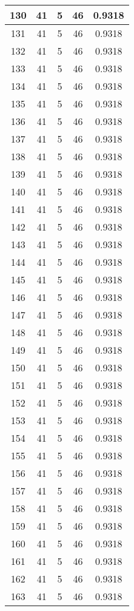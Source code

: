 \documentclass[letterpaper, 12pt]{article}
\begin{document}
\begin{longtable}{|c|c|c|c|c|}
\hline
130 & 41 & 5 & 46 & 0.9318 \\
\hline
131 & 41 & 5 & 46 & 0.9318 \\
\hline
132 & 41 & 5 & 46 & 0.9318 \\
\hline
133 & 41 & 5 & 46 & 0.9318 \\
\hline
134 & 41 & 5 & 46 & 0.9318 \\
\hline
135 & 41 & 5 & 46 & 0.9318 \\
\hline
136 & 41 & 5 & 46 & 0.9318 \\
\hline
137 & 41 & 5 & 46 & 0.9318 \\
\hline
138 & 41 & 5 & 46 & 0.9318 \\
\hline
139 & 41 & 5 & 46 & 0.9318 \\
\hline
140 & 41 & 5 & 46 & 0.9318 \\
\hline
141 & 41 & 5 & 46 & 0.9318 \\
\hline
142 & 41 & 5 & 46 & 0.9318 \\
\hline
143 & 41 & 5 & 46 & 0.9318 \\
\hline
144 & 41 & 5 & 46 & 0.9318 \\
\hline
145 & 41 & 5 & 46 & 0.9318 \\
\hline
146 & 41 & 5 & 46 & 0.9318 \\
\hline
147 & 41 & 5 & 46 & 0.9318 \\
\hline
148 & 41 & 5 & 46 & 0.9318 \\
\hline
149 & 41 & 5 & 46 & 0.9318 \\
\hline
150 & 41 & 5 & 46 & 0.9318 \\
\hline
151 & 41 & 5 & 46 & 0.9318 \\
\hline
152 & 41 & 5 & 46 & 0.9318 \\
\hline
153 & 41 & 5 & 46 & 0.9318 \\
\hline
154 & 41 & 5 & 46 & 0.9318 \\
\hline
155 & 41 & 5 & 46 & 0.9318 \\
\hline
156 & 41 & 5 & 46 & 0.9318 \\
\hline
157 & 41 & 5 & 46 & 0.9318 \\
\hline
158 & 41 & 5 & 46 & 0.9318 \\
\hline
159 & 41 & 5 & 46 & 0.9318 \\
\hline
160 & 41 & 5 & 46 & 0.9318 \\
\hline
161 & 41 & 5 & 46 & 0.9318 \\
\hline
162 & 41 & 5 & 46 & 0.9318 \\
\hline
163 & 41 & 5 & 46 & 0.9318 \\

\end{longtable}
\end{document}
